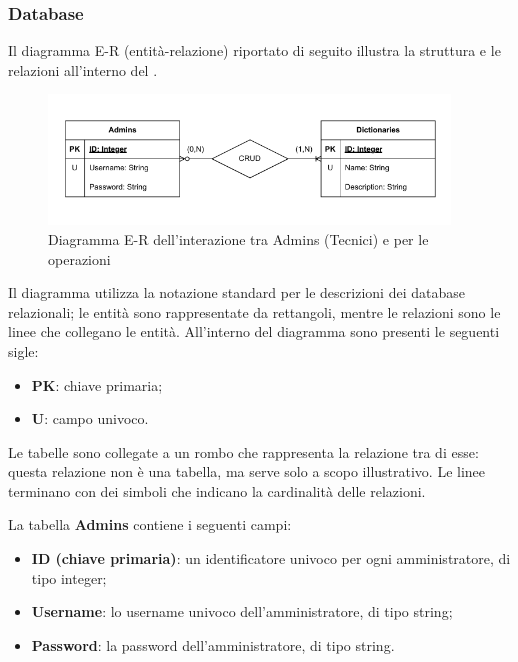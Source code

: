 \subsubsection{Database}

\par Il diagramma E-R (entità-relazione) riportato di seguito illustra la struttura e le relazioni all'interno del .

\begin{figure}[H]
    \centering
    \includegraphics[width=0.95\textwidth]{assets/Database/DiagrammiDB.png}
    \caption{Diagramma E-R dell'interazione tra Admins (Tecnici) e  per le operazioni }
\end{figure}

\par Il diagramma utilizza la notazione standard per le descrizioni dei database relazionali; le entità sono rappresentate da rettangoli, mentre le relazioni sono le linee che collegano le entità. All'interno del diagramma sono presenti le seguenti sigle:
\begin{itemize}
    \item \textbf{PK}: chiave primaria;
    \item \textbf{U}: campo univoco.
\end{itemize}

\vspace{0.5\baselineskip}
\par Le tabelle sono collegate a un rombo che rappresenta la relazione tra di esse: questa relazione non è una tabella, ma serve solo a scopo illustrativo. Le linee terminano con dei simboli che indicano la cardinalità delle relazioni.

\par La tabella \textbf{Admins} contiene i seguenti campi:
\begin{itemize}
    \item \textbf{ID (chiave primaria)}: un identificatore univoco per ogni amministratore, di tipo integer;
    \item \textbf{Username}: lo username univoco dell'amministratore, di tipo string;
    \item \textbf{Password}: la password dell'amministratore, di tipo string.
\end{itemize}

